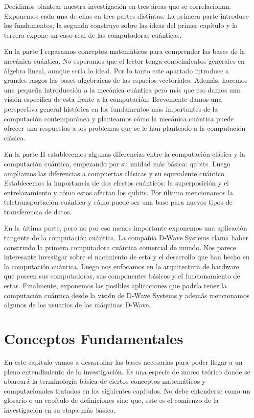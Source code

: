 \documentclass[11pt,a4paper]{article}
\begin{document}
Decidimos plantear nuestra investigación en tres áreas que se correlacionan. Exponemos cada una de ellas en tres partes distintas. La primera parte introduce los fundamentos, la segunda construye sobre las ideas del primer capítulo y la tercera expone un caso real de las computadoras cuánticas. 

En la parte I repasamos conceptos matemáticos para comprender las bases de la mecánica cuántica. No esperamos que el lector tenga conocimientos generales en álgebra lineal, aunque sería lo ideal. Por lo tanto este apartado introduce a grandes rasgos las bases algebraicas de las espacios vectoriales. Además, hacemos una pequeña introducción a la mecánica cuántica pero más que eso damos una visión específica de esta frente a la computación. Brevemente damos una perspectiva general histórica en los fundamentos más importantes de la computación contemporánea y planteamos cómo la mecánica cuántica puede ofrecer una respuestas a los problemas que se le han planteado a la computación clásica. 

En la parte II establecemos algunas diferencias entre la computación clásica y la computación cuántica, empezando por su unidad más básica: qubits. Luego ampliamos las diferencias a compuertas clásicas y su equivalente cuántico. Establecemos la importancia de dos efectos cuánticos: la superposición y el entrelazamiento y cómo estos afectan los qubits. Por último mencionamos la teletransportación cuántica y cómo puede ser una base para nuevos tipos de transferencia de datos.

En la última parte, pero no por eso menos importante exponemos una aplicación tangente de la computación cuántica. La compañía D-Wave Systems clama haber construido la primera computadora cuántica comercial de mundo. Nos parece interesante investigar sobre el nacimiento de esta y el desarrollo que han hecho en la computación cuántica. Luego nos enfocamos en la arquitectura de hardware que poseen sus computadoras, sus componentes básicos y el funcionamiento de estas. Finalmente, exponemos las posibles aplicaciones que podría tener la computación cuántica desde la visión de D-Wave Systems y además mencionamos algunos de los usuarios de las máquinas D-Wave.

\part{Conceptos Fundamentales}

En este capítulo vamos a desarrollar las bases necesarias para poder llegar a un pleno entendimiento de la investigación. Es una especie de marco teórico donde se abarcará la terminología básica de ciertos conceptos matemáticos y computacionales tratados en los siguientes capítulos. No debe entenderse como un glosario o un capítulo de definiciones sino que, este es el comienzo de la investigación en su etapa más básica.
\end{document}
